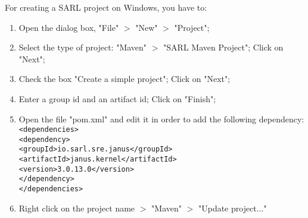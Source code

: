 \documentclass[article,english,nodocumentinfo,nosayenslogo,noicartslogo]{utbmciadreport}
\begin{document}
For creating a SARL project on Windows, you have to:
\begin{enumerate}
\item Open the dialog box, "File" $>$ "New" $>$ "Project";
\item Select the type of project: "Maven" $>$ "SARL Maven Project"; Click on "Next";
\item Check the box "Create a simple project"; Click on "Next";
\item Enter a group id and an artifact id; Click on "Finish";
\item Open the file "pom.xml" and edit it in order to add the following dependency:
\texttt{\string<dependencies\string>}\\
\texttt{\string<dependency\string>}\\
\texttt{\string<groupId\string>io.sarl.sre.janus\string</groupId\string>}\\
\texttt{\string<artifactId\string>janus.kernel\string</artifactId\string>}\\
\texttt{\string<version\string>3.0.13.0\string</version\string>}\\
\texttt{\string</dependency\string>}\\
\texttt{\string</dependencies\string>}
\item Right click on the project name $>$ "Maven" $>$ "Update project..."
\end{enumerate}



\end{document}

